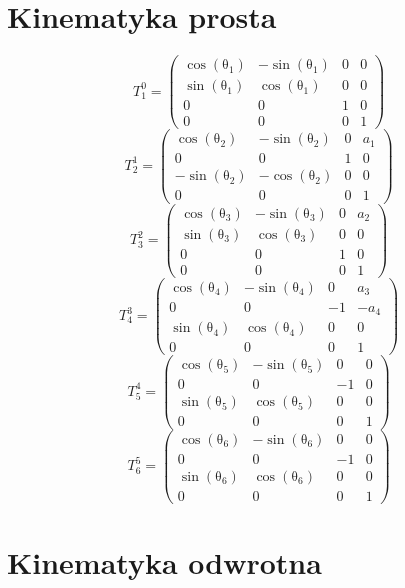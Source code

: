 \documentclass[]{article}
\begin{document}
\section{Kinematyka prosta}
\[T^0_1=\left(\begin{array}{cccc} \cos\!\left(\mathrm{\theta}_{1}\right) & - \sin\!\left(\mathrm{\theta}_{1}\right) & 0 & 0\\ \sin\!\left(\mathrm{\theta}_{1}\right) & \cos\!\left(\mathrm{\theta}_{1}\right) & 0 & 0\\ 0 & 0 & 1 & 0\\ 0 & 0 & 0 & 1 \end{array}\right)\]
\[
T^1_2=\left(\begin{array}{cccc} \cos\!\left(\mathrm{\theta}_{2}\right) & - \sin\!\left(\mathrm{\theta}_{2}\right) & 0 & a_{1}\\ 0 & 0 & 1 & 0\\ - \sin\!\left(\mathrm{\theta}_{2}\right) & - \cos\!\left(\mathrm{\theta}_{2}\right) & 0 & 0\\ 0 & 0 & 0 & 1 \end{array}\right)
\]
\[
T^2_3=\left(\begin{array}{cccc} \cos\!\left(\mathrm{\theta}_{3}\right) & - \sin\!\left(\mathrm{\theta}_{3}\right) & 0 & a_{2}\\ \sin\!\left(\mathrm{\theta}_{3}\right) & \cos\!\left(\mathrm{\theta}_{3}\right) & 0 & 0\\ 0 & 0 & 1 & 0\\ 0 & 0 & 0 & 1 \end{array}\right)
\]
\[
T^3_4=\left(\begin{array}{cccc} \cos\!\left(\mathrm{\theta}_{4}\right) & - \sin\!\left(\mathrm{\theta}_{4}\right) & 0 & a_{3}\\ 0 & 0 & -1 & - a_{4}\\ \sin\!\left(\mathrm{\theta}_{4}\right) & \cos\!\left(\mathrm{\theta}_{4}\right) & 0 & 0\\ 0 & 0 & 0 & 1 \end{array}\right)\]
\[
T^4_5=\left(\begin{array}{cccc} \cos\!\left(\mathrm{\theta}_{5}\right) & - \sin\!\left(\mathrm{\theta}_{5}\right) & 0 & 0\\ 0 & 0 & -1 & 0\\ \sin\!\left(\mathrm{\theta}_{5}\right) & \cos\!\left(\mathrm{\theta}_{5}\right) & 0 & 0\\ 0 & 0 & 0 & 1 \end{array}\right)\]
\[
T^5_6=\left(\begin{array}{cccc} \cos\!\left(\mathrm{\theta}_{6}\right) & - \sin\!\left(\mathrm{\theta}_{6}\right) & 0 & 0\\ 0 & 0 & -1 & 0\\ \sin\!\left(\mathrm{\theta}_{6}\right) & \cos\!\left(\mathrm{\theta}_{6}\right) & 0 & 0\\ 0 & 0 & 0 & 1 \end{array}\right)
\]
\section{Kinematyka odwrotna}
\end{document}
